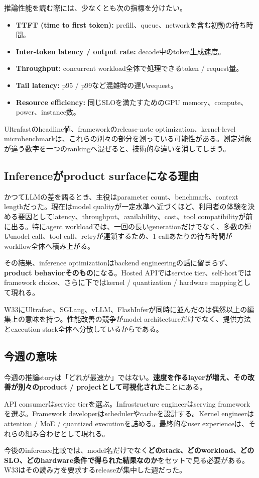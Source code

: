 推論性能を読む際には、少なくとも次の指標を分けたい。

\begin{itemize}
  \item \textbf{TTFT (time to first token):} prefill、queue、networkを含む初動の待ち時間。
  \item \textbf{Inter-token latency / output rate:} decode中のtoken生成速度。
  \item \textbf{Throughput:} concurrent workload全体で処理できるtoken / request量。
  \item \textbf{Tail latency:} p95 / p99など混雑時の遅いrequest。
  \item \textbf{Resource efficiency:} 同じSLOを満たすためのGPU memory、compute、power、instance数。
\end{itemize}

Ultrafastのheadline値、frameworkのrelease-note optimization、kernel-level microbenchmarkは、これらの別々の部分を測っている可能性がある。測定対象が違う数字を一つのrankingへ混ぜると、技術的な違いを消してしまう。

\subsection*{Inferenceがproduct surfaceになる理由}

かつてLLMの差を語るとき、主役はparameter count、benchmark、context lengthだった。現在はmodel qualityが一定水準へ近づくほど、利用者の体験を決める要因としてlatency、throughput、availability、cost、tool compatibilityが前に出る。特にagent workloadでは、一回の長いgenerationだけでなく、多数の短いmodel call、tool call、retryが連鎖するため、1 callあたりの待ち時間がworkflow全体へ積み上がる。

その結果、inference optimizationはbackend engineeringの話に留まらず、\textbf{product behaviorそのもの}になる。Hosted APIではservice tier、self-hostではframework choice、さらに下ではkernel / quantization / hardware mappingとして現れる。

W33にUltrafast、SGLang、vLLM、FlashInferが同時に並んだのは偶然以上の編集上の意味を持つ。性能改善の競争がmodel architectureだけでなく、提供方法とexecution stack全体へ分散しているからである。

\subsection*{今週の意味}

今週の推論storyは「どれが最速か」ではない。\textbf{速度を作るlayerが増え、その改善が別々のproduct / projectとして可視化された}ことにある。

API consumerはservice tierを選ぶ。Infrastructure engineerはserving frameworkを選ぶ。Framework developerはschedulerやcacheを設計する。Kernel engineerはattention / MoE / quantized executionを詰める。最終的なuser experienceは、それらの組み合わせとして現れる。

今後のinference比較では、model名だけでなく\textbf{どのstack、どのworkload、どのSLO、どのhardware条件で得られた結果なのか}をセットで見る必要がある。W33はその読み方を要求するreleaseが集中した週だった。
